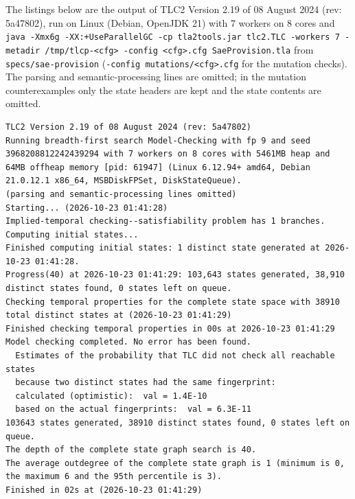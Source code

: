 \documentclass[11pt,a4paper]{article}
\begin{document}
The listings below are the output of TLC2 Version 2.19 of 08 August 2024
(rev: 5a47802), run on Linux (Debian, OpenJDK 21) with 7 workers on 8 cores
and \texttt{java -Xmx6g -XX:+UseParallelGC -cp tla2tools.jar tlc2.TLC
-workers 7 -metadir /tmp/tlcp-<cfg> -config <cfg>.cfg SaeProvision.tla} from
\texttt{specs/sae-provision} (\texttt{-config mutations/<cfg>.cfg} for the
mutation checks). The parsing and
semantic-processing lines are omitted; in the mutation counterexamples only
the state headers are kept and the state contents are omitted.
\clearpage{}
\begin{lstlisting}[float, caption={SaeProvision.cfg result}, captionpos=t, label={lst:tlc-saeprovision}]
TLC2 Version 2.19 of 08 August 2024 (rev: 5a47802)
Running breadth-first search Model-Checking with fp 9 and seed 3968208812242439294 with 7 workers on 8 cores with 5461MB heap and 64MB offheap memory [pid: 61947] (Linux 6.12.94+ amd64, Debian 21.0.12.1 x86_64, MSBDiskFPSet, DiskStateQueue).
(parsing and semantic-processing lines omitted)
Starting... (2026-10-23 01:41:28)
Implied-temporal checking--satisfiability problem has 1 branches.
Computing initial states...
Finished computing initial states: 1 distinct state generated at 2026-10-23 01:41:28.
Progress(40) at 2026-10-23 01:41:29: 103,643 states generated, 38,910 distinct states found, 0 states left on queue.
Checking temporal properties for the complete state space with 38910 total distinct states at (2026-10-23 01:41:29)
Finished checking temporal properties in 00s at 2026-10-23 01:41:29
Model checking completed. No error has been found.
  Estimates of the probability that TLC did not check all reachable states
  because two distinct states had the same fingerprint:
  calculated (optimistic):  val = 1.4E-10
  based on the actual fingerprints:  val = 6.3E-11
103643 states generated, 38910 distinct states found, 0 states left on queue.
The depth of the complete state graph search is 40.
The average outdegree of the complete state graph is 1 (minimum is 0, the maximum 6 and the 95th percentile is 3).
Finished in 02s at (2026-10-23 01:41:29)
\end{lstlisting}
\bigskip
\end{document}
